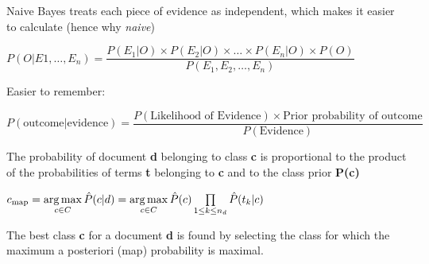 \documentclass[
../../NLP4W_Summary.tex,
]
{subfiles}
\begin{document}
\begin{greenbox}
    Naive Bayes treats each piece of evidence as independent, which makes it easier to calculate (hence why \textit{naive})
    \begin{center}
        \begin{smallmagbox*}
            $P(O|E1,\ldots,E_n) = \dfrac{P(E_1|O) \times P(E_2|O) \times \ldots \times P(E_n|O) \times P(O)}{P(E_1, E_2, \ldots, E_n)}$
        \end{smallmagbox*}
        
        Easier to remember:

        \begin{smallmagbox*}
            $P(\text{outcome}|\text{evidence}) = \dfrac{P(\text{Likelihood of Evidence}) \times \text{Prior probability of outcome}}{P(\text{Evidence})}$
        \end{smallmagbox*}
    \end{center}
\end{greenbox}

\begin{greenbox}
    \begin{center}
        \begin{smallmagbox*}
        \end{smallmagbox*}
    \end{center}
    The probability of document \textbf{d} belonging to class \textbf{c} is proportional to the product of the probabilities of terms \textbf{t} belonging to \textbf{c} and to the class prior \textbf{P(c)}

    \begin{center}
        \begin{smallmagbox*}
            $c_{\text{map}} = \mathop{\arg\max}\limits_{c \in C}\space \hat{P}(c|d) = \mathop{\arg\max}\limits_{c \in C} \space \hat{P}(c) \prod\limits_{1\leq k \leq n_d} \hat{P}(t_k | c)$ 
        \end{smallmagbox*}
    \end{center}
    The best class \textbf{c} for a document \textbf{d} is found by selecting the class for which the maximum a posteriori (map) probability is maximal.
\end{greenbox}
\end{document}

